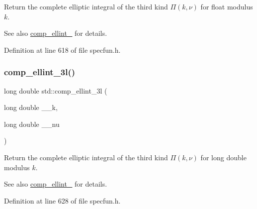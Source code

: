 Return the complete elliptic integral of the third kind $ \Pi(k,\nu) $ for {\ttfamily float} modulus $ k $. 

\begin{DoxySeeAlso}{See also}
\hyperlink{group__tr29124__math__spec__func_gae3abb5ca753f218c4c17fe7dc9feabc4}{comp\+\_\+ellint\+\_} for details. 
\end{DoxySeeAlso}


Definition at line 618 of file specfun.\+h.

\mbox{\label{group__tr29124__math__spec__func_ga1ca081fee102cd0d4d6b091285e495e5}} 
\subsubsection{\texorpdfstring{comp\+\_\+ellint\+\_\+3l()}{comp\_ellint\_3l()}}
{\footnotesize\ttfamily long double std\+::comp\+\_\+ellint\+\_\+3l (\begin{DoxyParamCaption}\item[{long double}]{\+\_\+\+\_\+k,  }\item[{long double}]{\+\_\+\+\_\+nu }\end{DoxyParamCaption})\hspace{0.3cm}{\ttfamily [inline]}}



Return the complete elliptic integral of the third kind $ \Pi(k,\nu) $ for {\ttfamily long double} modulus $ k $. 

\begin{DoxySeeAlso}{See also}
\hyperlink{group__tr29124__math__spec__func_gae3abb5ca753f218c4c17fe7dc9feabc4}{comp\+\_\+ellint\+\_} for details. 
\end{DoxySeeAlso}


Definition at line 628 of file specfun.\+h.

\mbox{\label{group__tr29124__math__spec__func_gac2ce366244694be909cd13bf8e1b439c}} 
